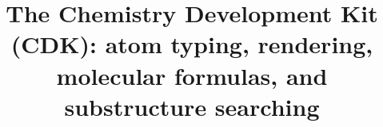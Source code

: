 \documentclass[10pt]{bmcart}
\begin{document}
\begin{frontmatter}

\begin{fmbox}

%

\title{The Chemistry Development Kit (CDK): atom typing, rendering, molecular formulas, and substructure searching}

\author[
   addressref={um},                                 %
   email={egon.willighagen@maastrichtuniversity.nl}
]{ }
\author[
   addressref={nm},
   email={john.may@cantab.net}
]{ }
\author[
   addressref={uppsala},
   email={jonathan.alvarsson@farmbio.uu.se}
]{ }
\author[
   addressref={uppsala},
   email={berg.arvid@gmail.com}
]{ }
\author[
   addressref={azg},                                %
   email={Lars.A.Carlsson@astrazeneca.com}
]{~}
\author[
   addressref={idea},
   email={jeliazkova.nina@gmail.com}
]{ }
\author[
   addressref={leicester},
   email={shk12@le.ac.uk}
]{ }
\author[
   addressref={wi_mit},                             %
   email={pluskal@wi.mit.edu}
]{~}
\author[
   addressref={miquel},                             %
   email={mrojas@qca.es}
]{~}
\author[
   addressref={uppsala},
   email={ola.spjuth@farmbio.uu.se}
]{ }
\author[
   addressref={gilleain},                           %
   email={gilleain.torrance@gmail.com}
]{ }
\author[
   addressref={um},
   email={chris.evelo@maastrichtuniversity.nl}
]{ }
\author[
   addressref={nih},
   email={guhar@mail.nih.gov}
]{ }
\author[
   addressref={ebi},
   email={steinbeck@ebi.ac.uk}
]{~}


\end{fmbox}
\end{frontmatter}
\end{document}
